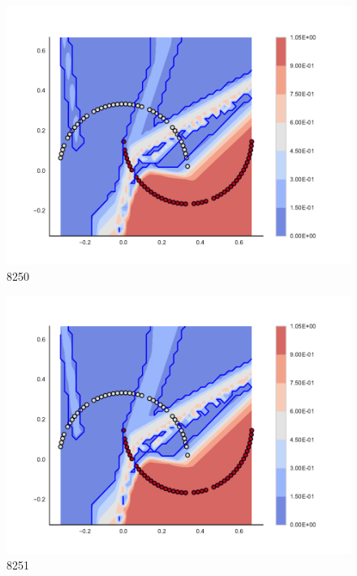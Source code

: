 \begin{subfigure}[b]{0.09\textwidth}
    \includegraphics[clip, trim=2.35cm 1.75cm 4.5cm 0cm,width=\textwidth]{img/convergence/8250.pdf}
    \caption{8250}
    \label{fig:convergence_8250}
\end{subfigure}
%
\begin{subfigure}[b]{0.09\textwidth}
    \includegraphics[clip, trim=2.35cm 1.75cm 4.5cm 0cm,width=\textwidth]{img/convergence/8251.pdf}
    \caption{8251}
    \label{fig:convergence_8251}
\end{subfigure}
%
